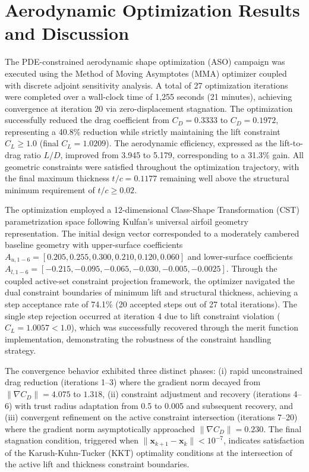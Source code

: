 \section{Aerodynamic Optimization Results and Discussion}

The PDE-constrained aerodynamic shape optimization (ASO) campaign was executed using the Method of Moving Asymptotes (MMA) optimizer coupled with discrete adjoint sensitivity analysis. A total of 27 optimization iterations were completed over a wall-clock time of 1,255 seconds (21 minutes), achieving convergence at iteration 20 via zero-displacement stagnation. The optimization successfully reduced the drag coefficient from $C_D = 0.3333$ to $C_D = 0.1972$, representing a 40.8\% reduction while strictly maintaining the lift constraint $C_L \ge 1.0$ (final $C_L = 1.0209$). The aerodynamic efficiency, expressed as the lift-to-drag ratio $L/D$, improved from 3.945 to 5.179, corresponding to a 31.3\% gain. All geometric constraints were satisfied throughout the optimization trajectory, with the final maximum thickness $t/c = 0.1177$ remaining well above the structural minimum requirement of $t/c \ge 0.02$.

The optimization employed a 12-dimensional Class-Shape Transformation (CST) parametrization space following Kulfan's universal airfoil geometry representation. The initial design vector corresponded to a moderately cambered baseline geometry with upper-surface coefficients $A_{u,1-6} = [0.205, 0.255, 0.300, 0.210, 0.120, 0.060]$ and lower-surface coefficients $A_{l,1-6} = [-0.215, -0.095, -0.065, -0.030, -0.005, -0.0025]$. Through the coupled active-set constraint projection framework, the optimizer navigated the dual constraint boundaries of minimum lift and structural thickness, achieving a step acceptance rate of 74.1\% (20 accepted steps out of 27 total iterations). The single step rejection occurred at iteration 4 due to lift constraint violation ($C_L = 1.0057 < 1.0$), which was successfully recovered through the merit function implementation, demonstrating the robustness of the constraint handling strategy.

The convergence behavior exhibited three distinct phases: (i) rapid unconstrained drag reduction (iterations 1--3) where the gradient norm decayed from $\|\nabla C_D\| = 4.075$ to $1.318$, (ii) constraint adjustment and recovery (iterations 4--6) with trust radius adaptation from 0.5 to 0.005 and subsequent recovery, and (iii) convergent refinement on the active constraint intersection (iterations 7--20) where the gradient norm asymptotically approached $\|\nabla C_D\| = 0.230$. The final stagnation condition, triggered when $\|\mathbf{x}_{k+1} - \mathbf{x}_k\| < 10^{-7}$, indicates satisfaction of the Karush-Kuhn-Tucker (KKT) optimality conditions at the intersection of the active lift and thickness constraint boundaries.

